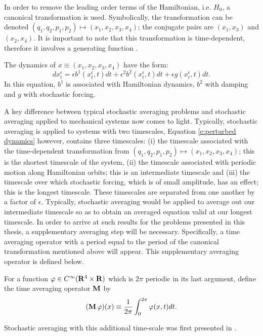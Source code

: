 In order to remove the leading order terms of the Hamiltonian, i.e. $H_0$, a canonical transformation is used. Symbolically, the transformation can be denoted $(q_1,q_2,p_1,p_2) \mapsto (x_1,x_2,x_3,x_4)$; the conjugate pairs are $(x_1,x_3)$ and $(x_2,x_4)$. It is important to note that this transformation is time-dependent, therefore it involves a generating function \citep[\S 9.1]{goldstein80:_class}.

The dynamics of $x \equiv (x_1,x_2,x_3,x_4)$ have the form:
\begin{equation}
\label{e:perturbed dynamics}
dx^\epsilon_t = \epsilon b^1(x^\epsilon_t,t) dt + \epsilon^2 b^2(x^\epsilon_t,t) dt + \epsilon g (x^\epsilon_t, t) dt.
\end{equation}
In this equation, $b^1$ is associated with Hamiltonian dynamics, $b^2$ with damping and $g$ with stochastic forcing.

A key difference between typical stochastic averaging problems and stochastic averaging applied to mechanical systems now comes to light. Typically, stochastic averaging is applied to systems with two timescales, Equation \eqref{e:perturbed dynamics} however, contains three timescales: (i) the timescale associated with the time-dependent transformation from $(q_1,q_2,p_1,p_2) \mapsto (x_1,x_2,x_3,x_4)$; this is the shortest timescale of the system, (ii) the timescale associated with periodic motion along Hamiltonian orbits; this is an intermediate timescale and (iii) the timescale over which stochastic forcing, which is of small amplitude, has an effect; this is the longest timescale. These timescales are separated from one another by a factor of $\epsilon$. Typically, stochastic averaging would be applied to average out our intermediate timescale so as to obtain an averaged equation valid at our longest timescale. In order to arrive at such results for the problems presented in this thesis, a supplementary averaging step will be necessary. Specifically, a time averaging operator with a period equal to the period of the canonical transformation mentioned above will appear. This supplementary averaging operator is defined below.
\begin{definition}
\label{d:Tave}
For a function $\varphi \in C^\infty(\mathbf R^4 \times \mathbf R)$ which is $2\pi$ periodic in its last argument, define the time averaging operator $\operatorname{\mathbf M}$ by
\[
(\operatorname{\mathbf M} \varphi)(x)\equiv \frac{1}{2\pi}\int_0^{2\pi} \varphi(x,t) dt.
\]
\end{definition}
Stochastic averaging with this additional time-scale was first presented in \citet{namachchivaya01:_unified_approac_noisy_nonlin_mathieu_type_system}.


